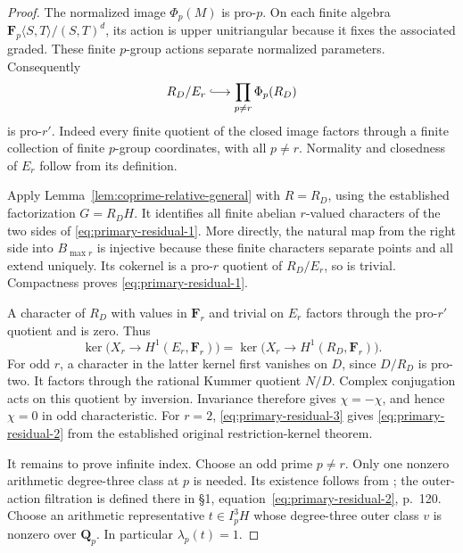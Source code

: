 \begin{proof}
The normalized image \(\Phi_p(M)\) is pro-\(p\).
On each finite algebra
\(\mathbf F_p\langle S,T\rangle/(S,T)^d\), its action is
upper unitriangular because it fixes the associated graded.
These finite \(p\)-group actions separate normalized parameters.
Consequently
\[
 R_D/E_r\lhook\joinrel\longrightarrow
                    \prod_{p\ne r}\Phi_p(R_D)
\]
is pro-\(r'\).
Indeed every finite quotient of the closed image factors
through a finite collection of finite \(p\)-group coordinates,
with all \(p\ne r\).
Normality and closedness of \(E_r\) follow from its definition.

Apply Lemma~\ref{lem:coprime-relative-general} with \(R=R_D\),
using the established factorization \(G=R_DH\).
It identifies all finite abelian \(r\)-valued characters of
the two sides of \eqref{eq:primary-residual-1}.
More directly, the natural map from the right side into
\(B_{\max r}\) is injective because these finite characters
separate points and all extend uniquely.
Its cokernel is a pro-\(r\) quotient of \(R_D/E_r\), so is
trivial. Compactness proves \eqref{eq:primary-residual-1}.

A character of \(R_D\) with values in \(\mathbf F_r\) and
trivial on \(E_r\) factors through the pro-\(r'\) quotient
and is zero. Thus
\begin{equation}
 \ker\bigl(X_r\to H^1(E_r,\mathbf F_r)\bigr)
 =
 \ker\bigl(X_r\to H^1(R_D,\mathbf F_r)\bigr).             \label{eq:primary-residual-3}
\end{equation}
For odd \(r\), a character in the latter kernel first vanishes
on \(D\), since \(D/R_D\) is pro-two.
It factors through the rational Kummer quotient \(N/D\).
Complex conjugation acts on this quotient by inversion.
Invariance therefore gives \(\chi=-\chi\), and hence
\(\chi=0\) in odd characteristic.
For \(r=2\), \eqref{eq:primary-residual-3} gives \eqref{eq:primary-residual-2} from the established original
restriction-kernel theorem.

It remains to prove infinite index.
Choose an odd prime \(p\ne r\).
Only one nonzero arithmetic degree-three class at \(p\) is
needed. Its existence follows from
\cite[Remark~8.6, p.~151]{HainMatsumoto2003}; the outer-action
filtration is defined there in \S1, equation~\eqref{eq:primary-residual-2}, p.~120.
Choose an arithmetic representative \(t\in I_p^3H\) whose
degree-three outer class \(v\) is nonzero over \(\mathbf Q_p\).
In particular \(\lambda_p(t)=1\).


\end{proof}
